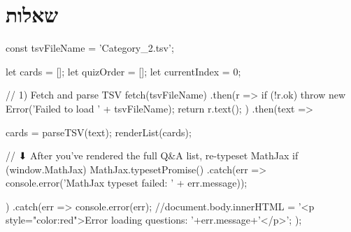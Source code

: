 \documentclass{tstextbook}
\begin{document}
\section{שאלות}


    const tsvFileName = 'Category_2.tsv';

    let cards = [];
    let quizOrder = [];
    let currentIndex = 0;

    // 1) Fetch and parse TSV
fetch(tsvFileName)
  .then(r => {
    if (!r.ok) throw new Error('Failed to load ' + tsvFileName);
    return r.text();
  })
  .then(text => {
    cards = parseTSV(text);
    renderList(cards);

    // ⬇ After you’ve rendered the full Q&A list, re-typeset MathJax
    if (window.MathJax) {
      MathJax.typesetPromise()
        .catch(err => console.error('MathJax typeset failed: ' + err.message));
    }
  })
  .catch(err => {
    console.error(err);
    //document.body.innerHTML =  '<p style="color:red">Error loading questions: '+err.message+'</p>';
  });
\end{document}
